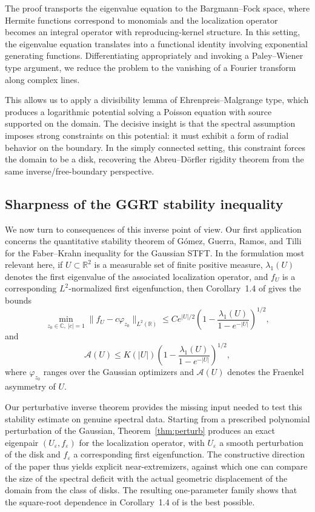 \documentclass[a4paper,11pt,reqno]{amsart}
\numberwithin{equation}{section}
\theoremstyle{plain} %
\theoremstyle{definition} %
\theoremstyle{remark}
\newcommand{\R}{\mathbb{R}}
\newcommand{\C}{\mathbb{C}}
\begin{document}
The proof transports the eigenvalue equation to the Bargmann--Fock space, where Hermite functions correspond to monomials and the localization operator becomes an integral operator with reproducing-kernel structure. In this setting, the eigenvalue equation translates into a functional identity involving exponential generating functions. Differentiating appropriately and invoking a Paley--Wiener type argument, we reduce the problem to the vanishing of a Fourier transform along complex lines.

This allows us to apply a divisibility lemma of Ehrenpreis--Malgrange type, which produces a logarithmic potential solving a Poisson equation with source supported on the domain. The decisive insight is that the spectral assumption imposes strong constraints on this potential: it must exhibit a form of radial behavior on the boundary. In the simply connected setting, this constraint forces the domain to be a disk, recovering the Abreu--D\"orfler rigidity theorem from the same inverse/free-boundary perspective.

\subsection{Sharpness of the GGRT stability inequality}

We now turn to consequences of this inverse point of view. Our first application concerns the quantitative stability theorem of G\'omez, Guerra, Ramos, and Tilli for the Faber--Krahn inequality for the Gaussian STFT. In the formulation most relevant here, if $U\subset \R^2$ is a measurable set of finite positive measure, $\lambda_1(U)$ denotes the first eigenvalue of the associated localization operator, and $f_U$ is a corresponding $L^2$-normalized first eigenfunction, then Corollary~1.4 of \cite{Gomez-Guerra-Ramos-Tilli} gives the bounds
\[
\min_{z_0\in\C,\ |c|=1}\|f_U-c\varphi_{z_0}\|_{L^2(\R)}
\leq
C e^{|U|/2}
\left(
1-\frac{\lambda_1(U)}{1-e^{-|U|}}
\right)^{1/2},
\]
and
\[
\mathcal A(U)
\leq
K(|U|)
\left(
1-\frac{\lambda_1(U)}{1-e^{-|U|}}
\right)^{1/2},
\]
where $\varphi_{z_0}$ ranges over the Gaussian optimizers and $\mathcal A(U)$ denotes the Fraenkel asymmetry of $U$.

Our perturbative inverse theorem provides the missing input needed to test this stability estimate on genuine spectral data. Starting from a prescribed polynomial perturbation of the Gaussian, Theorem~\ref{thm:perturb} produces an exact eigenpair $(U_\varepsilon,f_\varepsilon)$ for the localization operator, with $U_\varepsilon$ a smooth perturbation of the disk and $f_\varepsilon$ a corresponding first eigenfunction. The constructive direction of the paper thus yields explicit near-extremizers, against which one can compare the size of the spectral deficit with the actual geometric displacement of the domain from the class of disks. The resulting one-parameter family shows that the square-root dependence in Corollary~1.4 of \cite{Gomez-Guerra-Ramos-Tilli} is the best possible.
\end{document}
